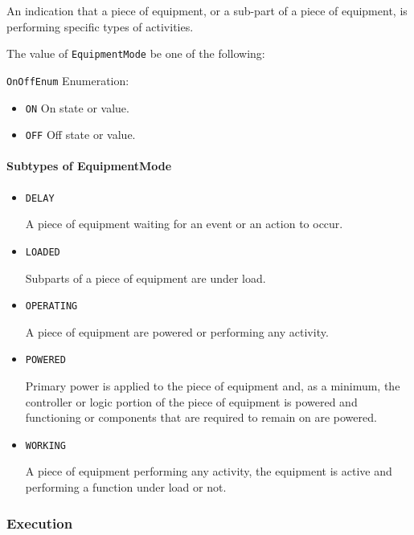 An indication that a piece of equipment, or a sub-part of a piece of equipment, is performing specific types of activities.


The value of \texttt{EquipmentMode} \MUST be one of the following: 


\texttt{OnOffEnum} Enumeration:

\begin{itemize}
\item \texttt{ON} \newline On state or value. 
\item \texttt{OFF} \newline Off state or value. 
\end{itemize}

\FloatBarrier

\paragraph{Subtypes of EquipmentMode}\mbox{}
\label{sec:Subtypes of EquipmentMode}

\begin{itemize}

\item \texttt{DELAY}


A piece of equipment waiting for an event or an action to occur.

\item \texttt{LOADED}


Subparts of a piece of equipment are under load.

\item \texttt{OPERATING}


A piece of equipment are powered or performing any activity.

\item \texttt{POWERED}


Primary  power is  applied  to the  piece  of  equipment and,  as  a minimum, the controller or logic portion of the piece of equipment is powered and functioning or components that are required to remain on are powered.

\item \texttt{WORKING}


A piece of equipment performing any activity, the equipment is active and performing a function under load or not.


\end{itemize}

\subsubsection{Execution}
\label{sec:Execution}




